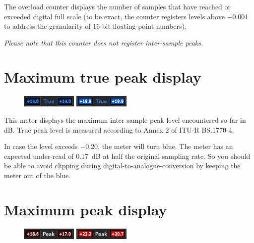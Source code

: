 The overload counter displays the number of samples that have reached
or exceeded digital full scale (to be exact, the counter registers
levels above \SI{-0.001}{\dBFS} to address the granularity of
\num{16}-bit floating-point numbers).

\emph{Please note that this counter does not register inter-sample
  peaks.}

\section{Maximum true peak display}

\begin{figure}
\includegraphics[scale=\screenshotscale,clip]{include/images/maximum_true_peak_normal.png}
\newline
\includegraphics[scale=\screenshotscale,clip]{include/images/maximum_true_peak_clipped.png}
\end{figure}

This meter displays the maximum inter-sample peak level encountered so
far in \si{\dB}.  True peak level is measured according to Annex 2 of
ITU-R BS.1770-4.

In case the level exceeds \SI{-0.20}{\dBFS}, the meter will turn blue.
The meter has an expected under-read of \SI{0.17}{\dB} at half the
original sampling rate.  So you should be able to avoid clipping
during digital-to-analogue-conversion by keeping the meter out of the
blue.

\section{Maximum peak display}

\begin{figure}
\includegraphics[scale=\screenshotscale,clip]{include/images/maximum_peak_normal.png}
\newline
\includegraphics[scale=\screenshotscale,clip]{include/images/maximum_peak_clipped.png}
\end{figure}

